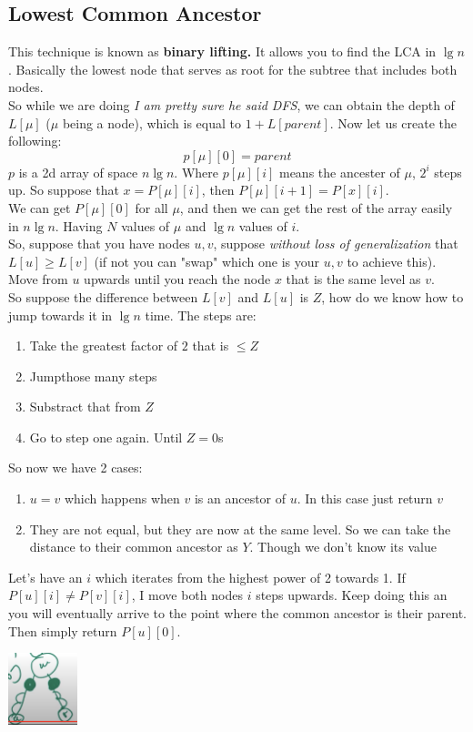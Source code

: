 \documentclass{IEEEtran}
\begin{document}
        \subsection{Lowest Common Ancestor}
            This technique is known as \textbf{binary lifting.} It allows you to find the LCA in $\lg{n}$. Basically the lowest node that serves as root for the subtree that includes both nodes.\\
            So while we are doing \textit{I am pretty sure he said DFS}, we can obtain the depth of $L[\mu]$ ($\mu$ being a node), which is equal to $1+L[parent]$. Now let us create the following:
            $$p[\mu][0]=parent$$
            $p$ is a 2d array of space $n\lg{n}$. Where $p[\mu][i]$ means the ancester of $\mu$, $2^i$ steps up. So suppose that $x = P[\mu][i]$, then $P[\mu][i+1] = P[x][i]$.\\
            We can get $P[\mu][0]$ for all $\mu$, and then we can get the rest of the array easily in $n\lg{n}$. Having $N$ values of $\mu$ and $\lg{n}$ values of $i$.\\
            So, suppose that you have nodes $u,v$, suppose \textit{without loss of generalization} that $L[u] \geq L[v]$ (if not you can "swap" which one is your $u,v$ to achieve this). Move from $u$ upwards until you reach the node $x$ that is the same level as $v$.\\
            So suppose the difference between $L[v]$ and $L[u]$ is $Z$, how do we know how to jump towards it in $\lg{n}$ time. The steps are:
            \begin{enumerate}
                \item Take the greatest factor of $2$ that is $\leq Z$
                \item Jumpthose many steps
                \item Substract that from $Z$
                \item Go to step one again. Until $Z=0$s
            \end{enumerate}
            So now we have 2 cases:
            \begin{enumerate}
                \item $u = v$ which happens when $v$ is an ancestor of $u$. In this case just return $v$
                \item They are not equal, but they are now at the same level. So we can take the distance to their common ancestor as $Y$. Though we don't know its value
            \end{enumerate}
            Let's have an $i$ which iterates from the highest power of 2 towards 1. If $P[u][i] \neq P[v][i]$, I move both nodes $i$ steps upwards. Keep doing this an you will eventually arrive to the point where the common ancestor is their parent. Then simply return $P[u][0]$.\\
            \begin{center}
                \includegraphics[width=0.15\textwidth]{lcaExample.png}
            \end{center}
\end{document}
